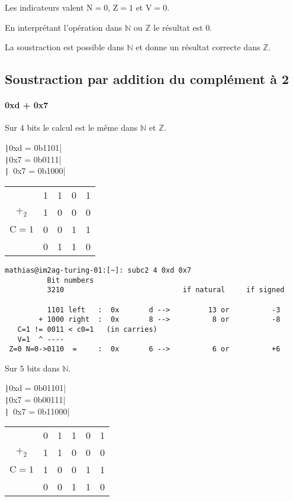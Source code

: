\documentclass[french, 12pt, a4paper]{article}
\begin{document}
Les indicateurs valent $\mathrm{N} = 0$, $\mathrm{Z} = 1$ et $\mathrm{V} = 0$.

En interprétant l'opération dans $\mathbb{N}$ ou $\mathbb{Z}$ le résultat est $0$.

La soustraction est possible dans $\mathbb{N}$ et donne un résultat correcte dans $\mathbb{Z}$.



\subsection{Soustraction par addition du complément à 2}

\paragraph{0xd + 0x7}

Sur $4$ bits le calcul est le même dans $\mathbb{N}$ et $\mathbb{Z}$.

\texttt|0xd = 0b1101|	\\
\texttt|0x7 = 0b0111|	\\
\texttt|~0x7 = 0b1000|

\begin{tabular}[c]{ccccc}
					& 1 & 1 & 0 & 1	\\
$+_2$				& 1 & 0 & 0 & 0 \\
$\mathrm{C} = 1$ 	& 0 & 0 & 1 & 1 \\	\cline{2-5}
					& 0 & 1 & 1 & 0 \\
\end{tabular}

\begin{verbatim}
mathias@im2ag-turing-01:[~]: subc2 4 0xd 0x7
		  Bit numbers
		  3210                            if natural     if signed

		  1101 left   :  0x       d -->         13 or          -3
		+ 1000 right  :  0x       8 -->          8 or          -8
   C=1 != 0011 < c0=1   (in carries)
   V=1  ^ ---- 
 Z=0 N=0->0110  =     :  0x       6 -->          6 or          +6
\end{verbatim}

Sur $5$ bits dans $\mathbb{N}$.

\texttt|0xd = 0b01101|	\\
\texttt|0x7 = 0b00111|	\\
\texttt|~0x7 = 0b11000|

\begin{tabular}[c]{cccccc}
					& 0 & 1 & 1 & 0 & 1	\\
$+_2$				& 1 & 1 & 0 & 0 & 0 \\
$\mathrm{C} = 1$ 	& 1 & 0 & 0 & 1 & 1 \\	\cline{2-6}
					& 0 & 0 & 1 & 1 & 0 \\
\end{tabular}
\end{document}
